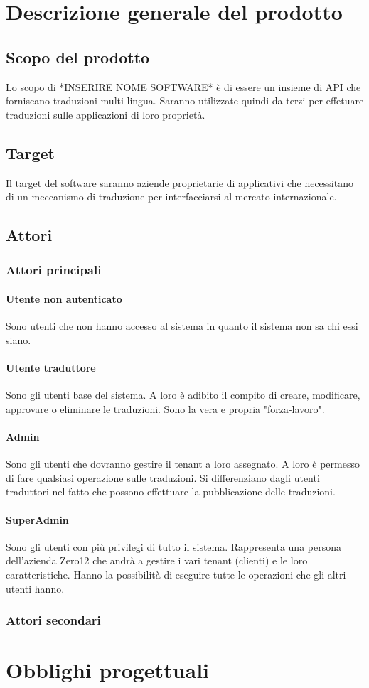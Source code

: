 \section{Descrizione generale del prodotto}
\subsection{Scopo del prodotto}
Lo scopo di *INSERIRE NOME SOFTWARE* è di essere un insieme di API che forniscano traduzioni multi-lingua. Saranno utilizzate quindi da terzi per effetuare traduzioni sulle applicazioni di loro proprietà.
\subsection{Target}
Il target del software saranno aziende proprietarie di applicativi che necessitano di un meccanismo di traduzione per interfacciarsi al mercato internazionale.
\subsection{Attori}
    \subsubsection{Attori principali}
        \paragraph{Utente non autenticato}
        Sono utenti che non hanno accesso al sistema in quanto il sistema non sa chi essi siano.
        \paragraph{Utente traduttore}
        Sono gli utenti base del sistema. A loro è adibito il compito di creare, modificare, approvare o eliminare le traduzioni. Sono la vera e propria "forza-lavoro".
        \paragraph{Admin}
        Sono gli utenti che dovranno gestire il tenant a loro assegnato. A loro è permesso di fare qualsiasi operazione sulle traduzioni. Si differenziano dagli utenti traduttori nel fatto che possono effettuare la pubblicazione delle traduzioni.
        \paragraph{SuperAdmin}
        Sono gli utenti con più privilegi di tutto il sistema. Rappresenta una persona dell'azienda Zero12 che andrà a gestire i vari tenant (clienti) e le loro caratteristiche. Hanno la possibilità di eseguire tutte le operazioni che gli altri utenti hanno.
    \subsubsection{Attori secondari}
\section{Obblighi progettuali}